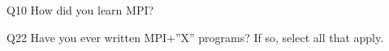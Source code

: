 \begin{description}%
\item{Q10} How did you learn MPI?%
\item{Q22} Have you ever written MPI+”X” programs? If so, select all that apply.%
\end{description}%
